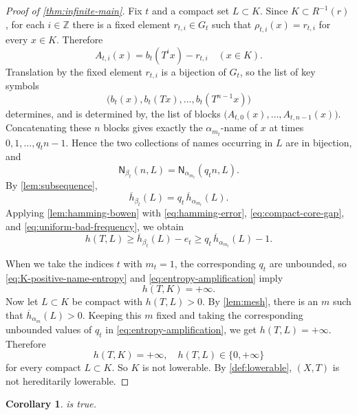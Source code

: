 \documentclass[12pt,letterpaper,reqno]{amsart}
\newcommand{\Z}{\mathbb Z}
\newcommand{\Nname}{\mathsf N}
\newtheorem{corollary}[theorem]{Corollary}
\theoremstyle{definition}
\theoremstyle{remark}
\numberwithin{equation}{section}
\begin{document}
\begin{proof}[Proof of \cref{thm:infinite-main}]
		
		Fix
		$t$ and a compact set $L\subset K$.  Since $K\subset R^{-1}(r)$, for each
		$i\in\Z$ there is a fixed element $r_{t,i}\in G_t$ such that
		$\rho_{t,i}(x)=r_{t,i}$ for every $x\in K$.  Therefore
		\[
		A_{t,i}(x)=b_t(T^ix)-r_{t,i}
		\quad(x\in K).
		\]
		Translation by the fixed element $r_{t,i}$ is a bijection of $G_t$, so the
		list of key symbols
		\[
		\bigl(b_t(x),b_t(Tx),\ldots,b_t(T^{n-1}x)\bigr)
		\]
		determines, and is determined by, the list of blocks
		$\bigl(A_{t,0}(x),\ldots,A_{t,n-1}(x)\bigr)$.  Concatenating these $n$
		blocks gives exactly the $\alpha_{m_t}$-name of $x$ at times
		$0,1,\ldots,q_tn-1$.  Hence the two collections of names occurring in
		$L$ are in bijection, and
		\begin{equation}
			\Nname_{\beta_t}(n,L)
			=
			\Nname_{\alpha_{m_t}}(q_tn,L).
			\label{eq:exact-name-count}
		\end{equation}
		By \cref{lem:subsequence},
		\begin{equation}
			\overline h_{\beta_t}(L)
			=
			q_t\,\overline h_{\alpha_{m_t}}(L).
			\label{eq:block-entropy-scaling}
		\end{equation}
		Applying \cref{lem:hamming-bowen} with
		\eqref{eq:hamming-error}, \eqref{eq:compact-core-gap}, and
		\eqref{eq:uniform-bad-frequency}, we obtain
		\begin{equation}
			h(T,L)
			\geq
			\overline h_{\beta_t}(L)-e_t
			\geq
			q_t\,\overline h_{\alpha_{m_t}}(L)-1.
			\label{eq:entropy-amplification}
		\end{equation}
		
		When we take the indices $t$ with $m_t=1$, the corresponding $q_t$ are unbounded, so
		\eqref{eq:K-positive-name-entropy} and
		\eqref{eq:entropy-amplification} imply
		\begin{equation}
			h(T,K)=+\infty.
			\label{eq:K-infinite}
		\end{equation}
		Now let $L\subset K$ be compact with $h(T,L)>0$. By \cref{lem:mesh}, there
		is an $m$ such that $\overline h_{\alpha_m}(L)>0$. Keeping this $m$ fixed
		and taking the corresponding unbounded values of $q_t$ in
		\eqref{eq:entropy-amplification}, we get $h(T,L)=+\infty$. Therefore
		\[
		h(T,K)=+\infty,
		\quad 
		h(T,L)\in\{0,+\infty\}
		\]
		for every compact $L\subset K$. So $K$ is not lowerable. By
		\cref{def:lowerable}, $(X,T)$ is not hereditarily lowerable.
	\end{proof}
		
	\begin{corollary}
		\label{cor:conjecture}
		 is true.
	\end{corollary}
	
\end{document}
